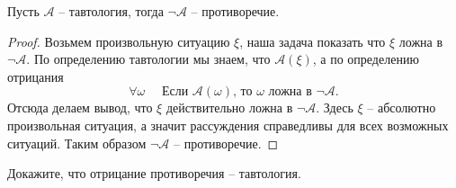 \begin{statement}
  Пусть $\mathcal{A}$ -- тавтология, тогда $ \neg \mathcal{A} $ -- противоречие.
\end{statement}
\begin{proof}
  Возьмем произвольную ситуацию $ \xi $, наша задача показать что $ \xi $ ложна в $ \neg \mathcal{A} $.
  По определению тавтологии мы знаем, что $ \mathcal{A}(\xi) $, а по определению отрицания \[
    \forall \omega \quad \text{ Если } \mathcal{A}(\omega) \text{, то } \omega \text{ ложна в } \neg\mathcal{A}. \]
  Отсюда делаем вывод, что $ \xi $ действительно ложна в $ \neg\mathcal{A} $. Здесь $ \xi $ -- абсолютно произвольная
  ситуация, а значит рассуждения справедливы для всех возможных ситуаций.
  Таким образом $ \neg\mathcal{A} $ -- противоречие.
\end{proof}
\begin{exercise}
  Докажите, что отрицание противоречия -- тавтология.
\end{exercise}
